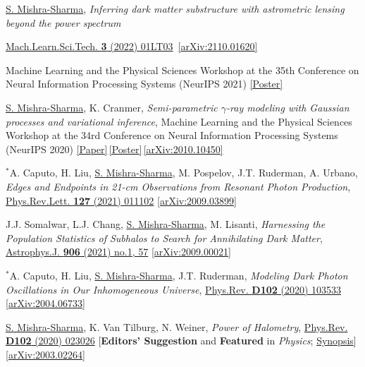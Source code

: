 \documentclass[letterpaper,11pt]{article}
\newenvironment{packed_itemize}{
\begin{itemize}[label=\raisebox{0.25ex}{\tiny$\bullet$}, topsep=0pt, partopsep=0pt]
  \setlength{\itemsep}{4.0pt}
  \setlength{\parskip}{0pt}
  \setlength{\parsep}{0pt}}{\end{itemize}
}
\newenvironment{packed_enumerate}[1][]{
\begin{etaremune}[#1]
  \setlength{\itemsep}{4.0pt}
  \setlength{\parskip}{0pt}
  \setlength{\parsep}{0pt}}{\end{etaremune}
}
\begin{document}
\begin{packed_enumerate}[start=63]
  \item \underline{S. Mishra-Sharma}, \emph{Inferring dark matter substructure with astrometric lensing beyond the power spectrum}  
  \begin{packed_itemize}
    \item {\href{https://doi.org/10.1088/2632-2153/ac494a}{Mach.Learn.Sci.Tech. \textbf{3} (2022) 01LT03} \,\href{https://arxiv.org/abs/2110.01620}{[arXiv:2110.01620]}}
    \item {{Machine Learning and the Physical Sciences Workshop at the 35th Conference on Neural Information Processing Systems (NeurIPS 2021)} \href{https://ml4physicalsciences.github.io/2021/files/NeurIPS_ML4PS_2021_22_poster.png}{[Poster]}}
    \end{packed_itemize}
  \item\underline{S. Mishra-Sharma}, K. Cranmer, \emph{Semi-parametric $\gamma$-ray modeling with Gaussian processes and variational inference}, {Machine Learning and the Physical Sciences Workshop at the 34rd Conference on Neural Information Processing Systems (NeurIPS 2020)} \href{https://ml4physicalsciences.github.io/2020/files/NeurIPS_ML4PS_2020_20.pdf}{[Paper]}\,\href{https://ml4physicalsciences.github.io/2020/files/NeurIPS_ML4PS_2020_20_poster.pdf}{[Poster]}\,\href{https://arxiv.org/abs/2010.10450}{[arXiv:2010.10450]} 
  \item $^*$A. Caputo, H. Liu, \underline{S. Mishra-Sharma}, M. Pospelov, J.T. Ruderman, A. Urbano, \emph{Edges and Endpoints in 21-cm Observations from Resonant Photon Production},  \href{https://journals.aps.org/prl/abstract/10.1103/PhysRevLett.127.011102}{Phys.Rev.Lett. \textbf{127} (2021) 011102} \href{https://arxiv.org/abs/2009.03899}{[arXiv:2009.03899]}
  \item J.J. Somalwar, L.J. Chang, \underline{S. Mishra-Sharma}, M. Lisanti, \emph{Harnessing the Population Statistics of Subhalos to Search for Annihilating Dark Matter}, \href{https://iopscience.iop.org/article/10.3847/1538-4357/abc87d}{Astrophys.J. \textbf{906} (2021) no.1, 57} \href{https://arxiv.org/abs/2009.00021}{[arXiv:2009.00021]}
  \item $^*$A. Caputo, H. Liu, \underline{S. Mishra-Sharma}, J.T. Ruderman, \emph{Modeling Dark Photon Oscillations in Our Inhomogeneous Universe}, \href{https://journals.aps.org/prd/abstract/10.1103/PhysRevD.102.103533}{Phys.Rev. \textbf{D102} (2020) 103533} \href{https://arxiv.org/abs/2004.06733}{[arXiv:2004.06733]}
  \item \underline{S. Mishra-Sharma}, K. Van Tilburg, N. Weiner, \emph{Power of Halometry}, \href{https://journals.aps.org/prd/abstract/10.1103/PhysRevD.102.023026}{Phys.Rev. \textbf{D102} (2020) 023026} [\textbf{Editors' Suggestion} and \textbf{Featured} in \emph{Physics}; \href{https://physics.aps.org/articles/v13/s98}{Synopsis}]  \href{https://arxiv.org/abs/2003.02264}{[arXiv:2003.02264]}

\end{packed_enumerate}
\end{document}
